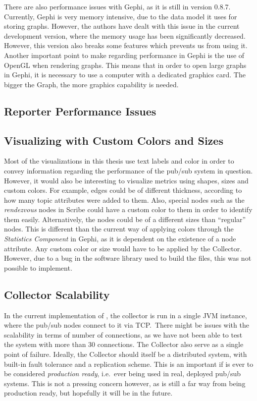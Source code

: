 There are also performance issues with Gephi, as it is still in version
0.8.7. Currently, Gephi is very memory intensive, due to the data model
it uses for storing graphs. However, the authors have dealt with this
issue in the current development version, where the memory usage has
been significantly decreased. However, this version also breaks some
features which prevents us from using it. Another important point to
make regarding performance in Gephi is the use of OpenGL when rendering
graphs. This means that in order to open large graphs in Gephi, it is
necessary to use a computer with a dedicated graphics card. The bigger
the Graph, the more graphics capability is needed.

\subsection{Reporter Performance Issues}

\subsection{Visualizing with Custom Colors and Sizes}

Most of the visualizations in this thesis use text labels and color in
order to convey information regarding the performance of the pub/sub
system in question. However, it would also be interesting to visualize
metrics using shapes, sizes and custom colors. For example, edges could
be of different thickness, according to how many topic attributes were
added to them. Also, special nodes such as the \emph{rendezvous} nodes
in Scribe could have a custom color to them in order to identify them
easily. Alternatively, the nodes could be of a different sizes than
``regular'' nodes. This is different than the current way of applying
colors through the \emph{Statistics Component} in Gephi, as it is
dependent on the existence of a node attribute. Any custom color or size
would have to be applied by the Collector. However, due to a bug in the
software library used to build the \gexf{} files, this was not possible
to implement.


\subsection{Collector Scalability}

In the current implementation of \demo{}, the collector is run in a
single JVM instance, where the pub/sub nodes connect to it via TCP.\
There might be issues with the scalability in terms of number of
connections, as we have not been able to test the system with more than
30 connections. The Collector also serve as a single point of failure.
Ideally, the Collector should itself be a distributed system, with
built-in fault tolerance and a replication scheme. This is an important
if \demo{} is ever to be considered \emph{production ready}, i.e.\ ever
being used in real, deployed pub/sub systems. This is not a pressing
concern however, as \demo{} is still a far way from being production
ready, but hopefully it will be in the future.


